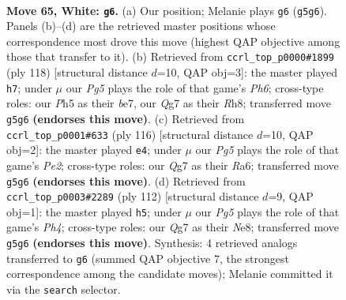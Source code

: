 \documentclass[11pt]{article}
\begin{document}
\clearpage

\begin{figure}[p]\centering
\begin{subfigure}{0.46\textwidth}\centering
\resizebox{\linewidth}{!}{%
\newchessgame
\chessboard[
  setfen={1r6/6Q1/2k5/6PP/4P3/8/2K5/8 w - - 1 65},
  showmover=false,
  pgfstyle=straightmove, color=movearrow, markmove={g5-g6}
]}
\caption{}
\end{subfigure}\hfill
\begin{subfigure}{0.46\textwidth}\centering
\resizebox{\linewidth}{!}{%
\newchessgame
\chessboard[
  setfen={7R/4b3/7P/3k4/8/3K2P1/5r2/8 w - - 0 60},
  showmover=false,
  pgfstyle=straightmove, color=movearrow, markmove={h6-h7}
]}
\caption{}
\end{subfigure}
\\[4pt]
\begin{subfigure}{0.46\textwidth}\centering
\resizebox{\linewidth}{!}{%
\newchessgame
\chessboard[
  setfen={8/5k2/R7/5p2/5P2/8/4PK2/2r5 w - - 17 59},
  showmover=false,
  pgfstyle=straightmove, color=movearrow, markmove={e2-e4}
]}
\caption{}
\end{subfigure}\hfill
\begin{subfigure}{0.46\textwidth}\centering
\resizebox{\linewidth}{!}{%
\newchessgame
\chessboard[
  setfen={4N1k1/8/8/5P2/7P/7K/3r4/8 w - - 5 57},
  showmover=false,
  pgfstyle=straightmove, color=movearrow, markmove={h4-h5}
]}
\caption{}
\end{subfigure}
\caption{\textbf{Move 65, White: \texttt{g6}.} (a) Our position; Melanie plays \texttt{g6} (\texttt{g5g6}). Panels (b)--(d) are the retrieved master positions whose correspondence most drove this move (highest QAP objective among those that transfer to it). (b) Retrieved from \texttt{ccrl\_top\_p0000\#1899} (ply 118) [structural distance $d$=10, QAP obj=3]: the master played \texttt{h7}; under $\mu$ our \emph{Pg5} plays the role of that game's \emph{Ph6}; cross-type roles: our \emph{P}h5 as their \emph{b}e7, our \emph{Q}g7 as their \emph{R}h8; transferred move \texttt{g5g6} \textbf{(endorses this move)}. (c) Retrieved from \texttt{ccrl\_top\_p0001\#633} (ply 116) [structural distance $d$=10, QAP obj=2]: the master played \texttt{e4}; under $\mu$ our \emph{Pg5} plays the role of that game's \emph{Pe2}; cross-type roles: our \emph{Q}g7 as their \emph{R}a6; transferred move \texttt{g5g6} \textbf{(endorses this move)}. (d) Retrieved from \texttt{ccrl\_top\_p0003\#2289} (ply 112) [structural distance $d$=9, QAP obj=1]: the master played \texttt{h5}; under $\mu$ our \emph{Pg5} plays the role of that game's \emph{Ph4}; cross-type roles: our \emph{Q}g7 as their \emph{N}e8; transferred move \texttt{g5g6} \textbf{(endorses this move)}. Synthesis: 4 retrieved analogs transferred to \texttt{g6} (summed QAP objective 7, the strongest correspondence among the candidate moves); Melanie committed it via the \texttt{search} selector.}
\label{fig:thought-m128}
\end{figure}
\end{document}
